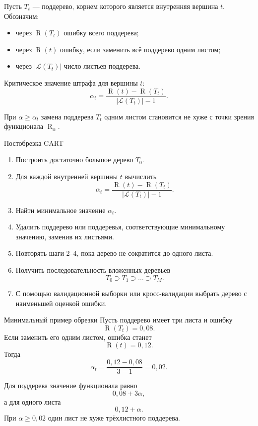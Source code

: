 \documentclass[12pt,a4paper]{article}
\theoremstyle{plain}
\theoremstyle{definition}
\theoremstyle{remark}
\newcommand{\Risk}{\operatorname{R}}
\begin{document}
Пусть $T_t$ --- поддерево, корнем которого является внутренняя вершина
$t$. Обозначим:
\begin{itemize}
    \item через $\Risk(T_t)$ ошибку всего поддерева;
    \item через $\Risk(t)$ ошибку, если заменить всё поддерево одним
    листом;
    \item через $|\mathcal{L}(T_t)|$ число листьев поддерева.
\end{itemize}

Критическое значение штрафа для вершины $t$:
\[
    \alpha_t
    =
    \frac{
        \Risk(t)-\Risk(T_t)
    }{
        |\mathcal{L}(T_t)|-1
    }.
\]

При $\alpha\ge\alpha_t$ замена поддерева $T_t$ одним листом становится
не хуже с точки зрения функционала $\Risk_\alpha$.

\begin{algorithmblock}{Постобрезка CART}
\begin{enumerate}[label=\arabic*.]
    \item Построить достаточно большое дерево $T_0$.

    \item Для каждой внутренней вершины $t$ вычислить
    \[
        \alpha_t
        =
        \frac{
            \Risk(t)-\Risk(T_t)
        }{
            |\mathcal{L}(T_t)|-1
        }.
    \]

    \item Найти минимальное значение $\alpha_t$.

    \item Удалить поддерево или поддеревья, соответствующие минимальному
    значению, заменив их листьями.

    \item Повторять шаги 2--4, пока дерево не сократится до одного листа.

    \item Получить последовательность вложенных деревьев
    \[
        T_0\supset T_1\supset\ldots\supset T_M.
    \]

    \item С помощью валидационной выборки или кросс-валидации выбрать
    дерево с наименьшей оценкой ошибки.
\end{enumerate}
\end{algorithmblock}

\begin{exampleblock}{Минимальный пример обрезки}
Пусть поддерево имеет три листа и ошибку
\[
    \Risk(T_t)=0{,}08.
\]
Если заменить его одним листом, ошибка станет
\[
    \Risk(t)=0{,}12.
\]
Тогда
\[
    \alpha_t
    =
    \frac{0{,}12-0{,}08}{3-1}
    =
    0{,}02.
\]

Для поддерева значение функционала равно
\[
    0{,}08+3\alpha,
\]
а для одного листа
\[
    0{,}12+\alpha.
\]
При $\alpha\ge 0{,}02$ один лист не хуже трёхлистного поддерева.
\end{exampleblock}
\end{document}
